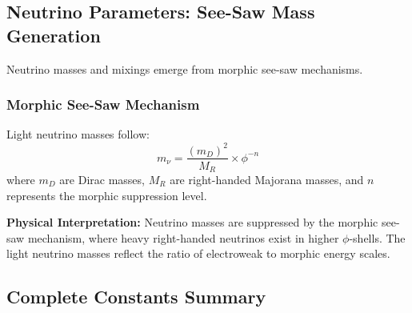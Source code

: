 \subsection{Neutrino Parameters: See-Saw Mass Generation}

Neutrino masses and mixings emerge from morphic see-saw mechanisms.

\subsubsection{Morphic See-Saw Mechanism}

\begin{theorem}
Light neutrino masses follow:
\begin{equation}
m_\nu = \frac{(m_D)^2}{M_R} \times \phi^{-n}
\end{equation}
where $m_D$ are Dirac masses, $M_R$ are right-handed Majorana masses, and $n$ represents the morphic suppression level.
\end{theorem}

\textbf{Physical Interpretation:}
Neutrino masses are suppressed by the morphic see-saw mechanism, where heavy right-handed neutrinos exist in higher $\phi$-shells. The light neutrino masses reflect the ratio of electroweak to morphic energy scales.

\subsection{Complete Constants Summary}

